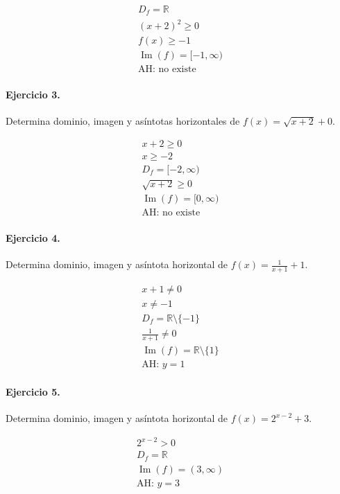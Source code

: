 \documentclass[11pt,a4paper]{article}
\begin{document}
\[
\begin{aligned}
D_f=\mathbb{R}\\
(x+2)^2\ge 0\\
f(x)\ge -1\\
\operatorname{Im}(f)=[-1,\infty)\\
\text{{AH: no existe}}
\end{aligned}
\]


\paragraph{Ejercicio 3.} Determina dominio, imagen y asíntotas horizontales de $f(x)=\sqrt{x+2}+0$.

\[
\begin{aligned}
x+2\ge0\\
x\ge -2\\
D_f=[-2,\infty)\\
\sqrt{x+2}\ge0\\
\operatorname{Im}(f)=[0,\infty)\\
\text{{AH: no existe}}
\end{aligned}
\]


\paragraph{Ejercicio 4.} Determina dominio, imagen y asíntota horizontal de $f(x)=\frac{1}{x+1}+1$.

\[
\begin{aligned}
x+1\ne0\\
x\ne -1\\
D_f=\mathbb{R}\setminus\{-1\}\\
\frac{1}{x+1}\ne0\\
\operatorname{Im}(f)=\mathbb{R}\setminus\{1\}\\
\text{AH: }y=1
\end{aligned}
\]


\paragraph{Ejercicio 5.} Determina dominio, imagen y asíntota horizontal de $f(x)=2^{x-2}+3$.

\[
\begin{aligned}
2^{x-2}>0\\
D_f=\mathbb{R}\\
\operatorname{Im}(f)=(3,\infty)\\
\text{AH: }y=3
\end{aligned}
\]
\end{document}
